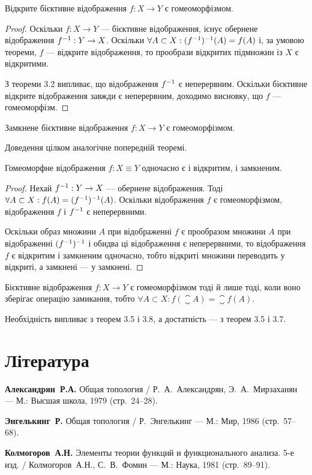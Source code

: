 \begin{theorem}
Відкрите бієктивне відображення $f: X \to Y$ є гомеоморфізмом.
\end{theorem}

\begin{proof}
Оскільки $f: X \to Y$ --- бієктивне
відображення, існує обернене відображення $f^{-1} : Y \to X$.
Оскільки $\forall A \subset X: (f^{-1} )^{-1}(A) = f(A)$ і, за умовою теореми,
$f$ --- відкрите відображення, то прообрази відкритих
підмножин із $X$ є відкритими.

З теореми 3.2 випливає, що
відображення $f^{-1} $ є неперервним. Оскільки бієктивне
відкрите відображення завжди є неперервним, доходимо
висновку, що $f$ --- гомеоморфізм.
\end{proof}

\begin{theorem}
Замкнене бієктивне відображення
$f: X \to Y$ є гомеоморфізмом.
\end{theorem}

Доведення цілком аналогічне попередній теоремі.

\begin{theorem}
Гомеоморфне відображення $f: X \equiv Y$ одночасно є і відкритим, і замкненим.
\end{theorem}

\begin{proof}
Нехай $f^{-1} : Y \to X$ --- обернене відображення.
Тоді $\forall A \subset X: f(A) = (f^{-1} )^{-1}(A)$.
Оскільки відображення $f$ є гомеоморфізмом, відображення $f$ і $f^{-1} $
є неперервними.

Оскільки образ множини $A$ при відображенні $f$ є прообразом
множини $A$ при відображенні $(f^{-1} )^{-1} $ і обидва ці
відображення є неперервними, то відображення $f$ є
відкритим і замкненим одночасно, тобто відкриті множини
переводить у відкриті, а замкнені --- у замкнені.
\end{proof}

\begin{theorem}
Бієктивне відображення $f: X \to Y$ є
гомеоморфізмом тоді й лише тоді, коли воно зберігає
операцію замикання, тобто $\forall A \subset X: f(\closure{A}) = \closure{f(A)}$.
\end{theorem}

Необхідність випливає з теорем 3.5 і 3.8, а достатність ---
з теорем 3.5 і 3.7.

\section{Література}

\begin{enumerate}[label={[\arabic*]}]
\item \textbf{Александрян~Р.А.}
Общая топология /
Р.~А.~Александрян, Э.~А.~Мирзаханян ---
М.: Высшая школа, 1979 (стр.~24--28).
\item \textbf{Энгелькинг~Р.}
Общая топология /
Р.~Энгелькинг ---
М.: Мир, 1986 (стр.~57--68).
\item \textbf{Колмогоров~А.Н.}
Элементы теории функций и функционального анализа. 5-е изд. /
Колмогоров~А.Н., С.~В.~Фомин ---
М.: Наука, 1981 (стр.~89--91).
\end{enumerate}